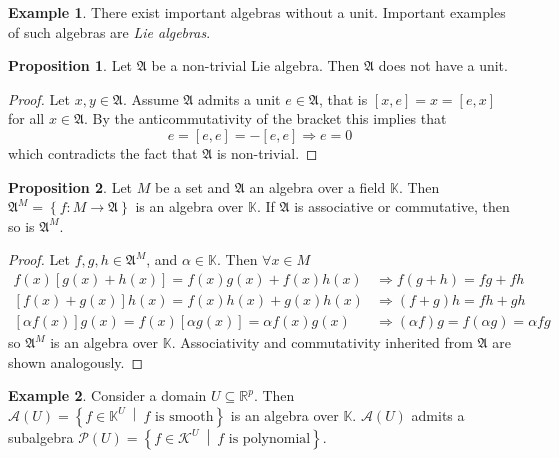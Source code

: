 \documentclass{article}
\theoremstyle{definition}
\newtheorem{proposition}{Proposition}
\newtheorem{example}{Example}
\begin{document}
\begin{example}
    There exist important algebras without a unit. Important examples of such algebras are \emph{Lie algebras}.
\end{example}

\begin{proposition}
    Let $\mathfrak{A}$ be a non-trivial Lie algebra. Then $\mathfrak{A}$ does not have a unit.
\end{proposition}
\begin{proof}
    Let $x, y \in \mathfrak{A}$. Assume $\mathfrak{A}$ admits a unit $e \in \mathfrak{A}$, that is $\left[x, e \right] = x = \left[ e, x \right]$ for all $x \in \mathfrak{A}$. By the anticommutativity of the bracket this implies that
    \begin{equation*}
        e = \left[ e, e \right] = -\left[ e, e \right]
        \Longrightarrow e = 0
    \end{equation*}
    which contradicts the fact that $\mathfrak{A}$ is non-trivial.
\end{proof}

\begin{proposition}
    Let $M$ be a set and $\mathfrak{A}$ an algebra over a field $\mathbb{K}$. Then $\mathfrak{A}^M = \left\{ f: M \longrightarrow \mathfrak{A} \right\}$ is an algebra over $\mathbb{K}$. If $\mathfrak{A}$ is associative or commutative, then so is $\mathfrak{A}^M$.
\end{proposition}
\begin{proof}
    Let $f, g, h \in \mathfrak{A}^M$, and $\alpha \in \mathbb{K}$. Then $\forall x \in M$
    \begin{align*}
        f(x) \left[ g(x) + h(x) \right] = f(x) g(x) + f(x)h(x) 
        & \Longrightarrow f(g + h) = fg + fh \\
        \left[f(x) + g(x) \right] h(x)  = f(x) h(x) + g(x)h(x) 
        & \Longrightarrow (f + g)h = fh + gh \\
        \left[ \alpha f(x) \right] g(x) = f(x) \left[ \alpha g(x) \right]
         = \alpha f(x) g(x) & \Longrightarrow (\alpha f) g = f(\alpha g) = \alpha fg
    \end{align*}
    so $\mathfrak{A}^M$ is an algebra over $\mathbb{K}$. Associativity and commutativity inherited from $\mathfrak{A}$ are shown analogously.
\end{proof}

\begin{example}
    Consider a domain $U \subseteq \mathbb{R}^p$. Then $
        \mathcal{A}(U) = \left\{ f \in \mathbb{K}^U \ \middle| \ f \text{ is smooth} \right\} $
    is an algebra over $\mathbb{K}$. $\mathcal{A}(U)$ admits a subalgebra $\mathcal{P}(U) = \left\{ f \in \mathcal{K}^U \ \middle| \ f \text{ is polynomial} \right\}$.
\end{example}
\end{document}
